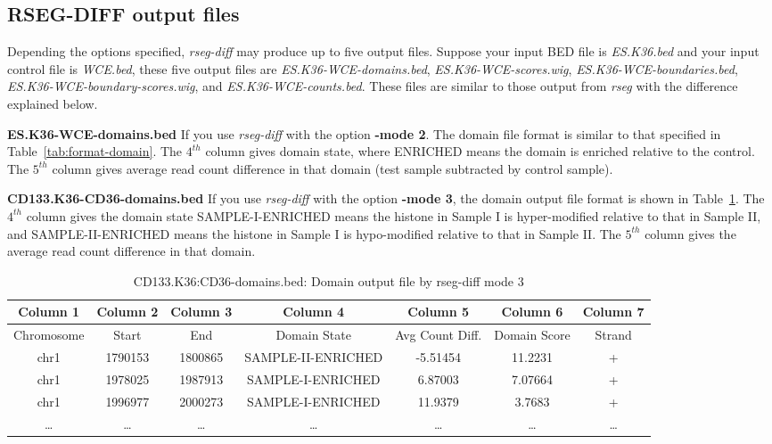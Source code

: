 \documentclass[11pt]{report}
\begin{document}
\subsection{RSEG-DIFF output files}
\label{sec:rseg-output}

Depending the options specified, \textit{rseg-diff} may produce up to
five output files. Suppose your input BED file is \textit{ES.K36.bed}
and your input control file is \textit{WCE.bed}, these five output
files are \textit{ES.K36-WCE-domains.bed},
\textit{ES.K36-WCE-scores.wig}, \textit{ES.K36-WCE-boundaries.bed},
\textit{ES.K36-WCE-boundary-scores.wig}, and 
\textit{ES.K36-WCE-counts.bed}. These files are similar to those
output from \textit{rseg} with the difference explained below.

\textbf{ES.K36-WCE-domains.bed} If you use \textit{rseg-diff} with the
option \textbf{-mode 2}. The domain file format is similar to that
specified in Table~\ref{tab:format-domain}. The $4^{th}$ column gives
domain state, where ENRICHED means the domain is enriched relative to
the control. The $5^{th}$ column gives average read count difference
in that domain (test sample subtracted by control sample).

\textbf{CD133.K36-CD36-domains.bed} If you use \textit{rseg-diff} with
the option \textbf{-mode 3}, the domain output file format is shown in
Table~\ref{tab:format-domain-diff}. The $4^{th}$ column gives the
domain state SAMPLE-I-ENRICHED means the histone in Sample I is
hyper-modified relative to that in Sample II, and SAMPLE-II-ENRICHED
means the histone in Sample I is hypo-modified relative to that in
Sample II.  The $5^{th}$ column gives the average read count
difference in that domain.

\begin{table}[th]
  \centering
  \begin{tabular}{c c c c c c c}
Column 1 & Column 2 & Column 3 &  Column 4 & Column 5 &  Column 6  &
Column 7 \\
\hline
Chromosome  & Start & End & Domain State &  Avg Count Diff.& Domain Score &  Strand \\
\hline
chr1&    1790153& 1800865& SAMPLE-II-ENRICHED &     -5.51454   &     11.2231& + \\
chr1&    1978025& 1987913& SAMPLE-I-ENRICHED &      6.87003& 7.07664& + \\
chr1&    1996977& 2000273& SAMPLE-I-ENRICHED &      11.9379 &3.7683 & + \\
\ldots & \ldots &\ldots &\ldots &\ldots &\ldots & \ldots\\ 
\hline
  \end{tabular}
  \caption{CD133.K36:CD36-domains.bed: Domain output file  by rseg-diff mode 3}
  \label{tab:format-domain-diff}
\end{table}
\end{document}
